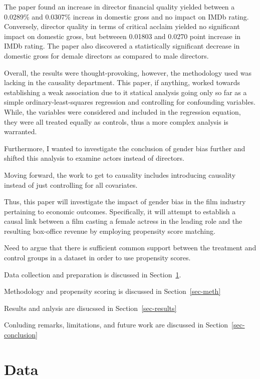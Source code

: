 \documentclass[
]{agujournal2019}
\begin{document}
The paper found an increase in director financial quality yielded
between a 0.0289\% and 0.0307\% increas in domestic gross and no impact
on IMDb rating. Conversely, director quality in terms of critical
acclaim yielded no significant impact on domestic gross, but betweeen
0.01803 and 0.0270 point increase in IMDb rating. The paper also
discovered a statistically significant decrease in domestic gross for
demale directors as compared to male directors.

Overall, the results were thought-provoking, however, the methodology
used was lacking in the causality department. This paper, if anything,
worked towards establishing a weak association due to it statical
analysis going only so far as a simple ordinary-least-squares regression
and controlling for confounding variables. While, the variables were
considered and included in the regression equation, they were all
treated equally as controls, thus a more complex analysis is warranted.

Furthermore, I wanted to investigate the conclusion of gender bias
further and shifted this analysis to examine actors instead of
directors.

Moving forward, the work to get to causality includes introducing
causality instead of just controlling for all covariates.

Thus, this paper will investigate the impact of gender bias in the film
industry pertaining to economic outcomes. Specifically, it will attempt
to establish a causal link between a film casting a female actress in
the leading role and the resulting box-office revenue by employing
propensity score matching.

Need to argue that there is sufficient common support between the
treatment and control groups in a dataset in order to use propensity
scores.

Data collection and preparation is discussed in Section~\ref{sec-data}.

Methodology and propensity scoring is discussed in
Section~\ref{sec-meth}

Results and anlysis are disucssed in Section~\ref{sec-results}

Conluding remarks, limitations, and future work are discussed in
Section~\ref{sec-conclusion}

\section{Data}\label{sec-data}
\end{document}
